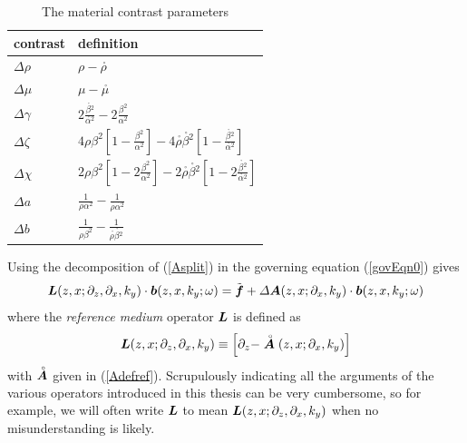 \documentclass[11pt]{article}
\newcommand{\bmi}[1]{\mbox{\boldmath$\mit #1$\unboldmath}}
\newcommand{\rf}[1]{\stackrel{\scriptscriptstyle _{\,\,\circ}}{ #1}}
\begin{document}
\begin{table}[h]
\begin{tabular*}{100mm}{ll}\hline
contrast & definition\\ \hline
 $ \Delta \rho$ & $\rho - {\rf \rho}$\\
 $ \Delta \mu$ & $\mu - {\rf \mu}$\\
 $ \Delta \gamma$ & $2{\frac{{ \rf \beta }{}^{2}}{{ \rf \alpha }{}^{2}}}-
 2{\frac{{\beta}^{2}}{{\alpha}^{2}}}$\\
$\Delta \zeta$ &$4 \rho{\beta
}^{2}\left[{1-{\frac{{\beta  }^{2}}{{\alpha}^{2}}}}\right]-4{\rf \rho}
{\rf \beta }{}^{  2}\left[{
 1-{\frac{{ \rf \beta }{}^{2}}{{\rf  \alpha }{}^{2}}}}\right]$\\
$\Delta \chi$ &$2 \rho {\beta}^{2}\left[{1-2{\frac{{ \beta
}^{2}}{{\alpha}^{2}}}}\right]-2{\rf \rho} {\rf \beta }{}^{  2}\left[{
 1-2{\frac{{\rf \beta }{}^{2}}{{\rf \alpha }{}^{2}}}}\right]$\\
$\Delta  a$ & ${\frac{1}{\rho{\alpha}^{2}}}-
 {\frac{1}{ {\rf \rho} {{\rf \alpha} }{}^{  2}}}$\\
$\Delta  b$ & ${\frac{1}{\rho{\beta}^{2}}}-
 {\frac{1}{ {\rf \rho} {{\rf \beta} }{}^{  2}}}$\\
 \hline
\end{tabular*}
\caption{\label{contrastTable} { The material contrast parameters}}
\end{table}

Using the decomposition of (\ref{Asplit}) in the governing equation (\ref{govEqn0}) gives
\begin{equation} \label{Leqn}
{\bmi L}(z,x;{\partial }_{z},{\partial }_{x},{k}_{y})\cdot{\bmi b}(z,x,k_y; \omega) =
\tilde{\bmi f} + {\mit \Delta} {\bmi A}(z,x;{\partial }_{x},{k}_{y})\cdot{\bmi b}(z,x,k_y; \omega)
\end{equation}
where the {\em reference medium\/} operator ${\bmi L}$ is defined as
\begin{equation} \label{Lref}
{\bmi L}(z,x;{\partial }_{z},{\partial }_{x},{k}_{y})\equiv
\left[\partial_{z}-\rf{\bmi A}(z,x;{\partial }_{x},{k}_{y})\right]
\end{equation}
with $\rf{\bmi A}$ given in (\ref{Adefref}).
Scrupulously indicating all the arguments of the various operators introduced in
this thesis can be very cumbersome, so for example, we will often write
${\bmi L}$ to mean ${\bmi
L}(z,x;{\partial }_{z},{\partial }_{x},{k}_{y})$ when no misunderstanding
is likely.

\end{document}
